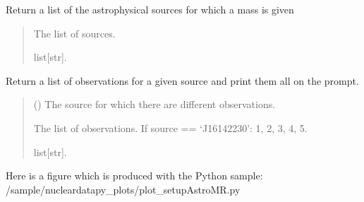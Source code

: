 \documentclass[letterpaper,10pt,english]{sphinxmanual}
\begin{document}
\begin{fulllineitems}
\label{\detokenize{source/api/setup_astro_mr:nucleardatapy.setup_astro_mr.astro_mr}}
\pysigstartsignatures
\pysiglinewithargsret
{}
{}
{}
\pysigstopsignatures
\sphinxAtStartPar
Return a list of the astrophysical sources for which a mass is given
\begin{quote}\begin{description}
\sphinxAtStartPar
The list of sources.

\sphinxAtStartPar
list{[}str{]}.

\end{description}\end{quote}

\end{fulllineitems}


\begin{fulllineitems}
\label{\detokenize{source/api/setup_astro_mr:nucleardatapy.setup_astro_mr.astro_mr_source}}
\pysigstartsignatures
\pysiglinewithargsret
{}
{}
{}
\pysigstopsignatures
\sphinxAtStartPar
Return a list of observations for a given source and print them all on the prompt.
\begin{quote}\begin{description}
\sphinxAtStartPar
{} () \textendash{} The source for which there are different observations.

\sphinxAtStartPar
The list of observations.     If source == ‘J1614\textendash{}2230’: 1, 2, 3, 4, 5.

\sphinxAtStartPar
list{[}str{]}.

\end{description}\end{quote}

\end{fulllineitems}


\sphinxAtStartPar
Here is a figure which is produced with the Python sample: /sample/nucleardatapy\_plots/plot\_setupAstroMR.py
\end{document}
